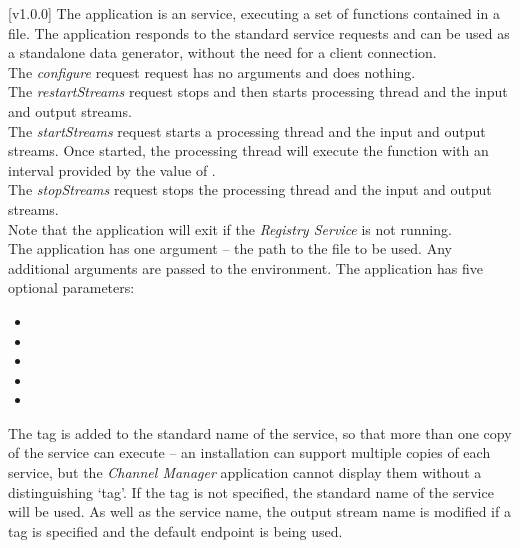 [v1.0.0]
The  application is an  service,
executing a set of \JS{} functions contained in a file.
The application responds to the standard  service requests and can be used
as a standalone data generator, without the need for a client connection.\\

The \emph{configure} request request has no arguments and does nothing.\\

The \emph{restartStreams} request stops and then starts processing thread and the input
and output streams.\\

The \emph{startStreams} request starts a processing thread and the input and output
streams.
Once started, the processing thread will execute the  function with
an interval provided by the value of .\\

The \emph{stopStreams} request stops the processing thread and the input and output
streams.\\ 

Note that the application will exit if the \emph{Registry Service} is not running.\\

The application has one argument -- the path to the \JS{} file to be used.
Any additional arguments are passed to the \JS{} environment.
The application has five optional parameters:
\begin{itemize}
\item {}
\item {}
\item {}
\item {}
\item {}
\end{itemize}
The tag is added to the standard name of the service, so that more than one copy of the
service can execute -- an \mplusm{} installation can support multiple copies of each
 service, but the \emph{Channel Manager} application cannot display them
without a distinguishing `tag'.
If the tag is not specified, the standard name of the service will be used.
As well as the service name, the output stream name is modified if a tag is specified and
the default endpoint is being used.\\

